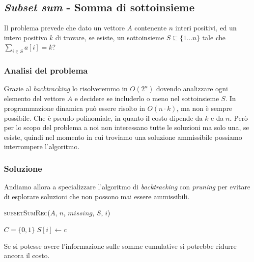     \subsection{\textit{Subset sum} - Somma di sottoinsieme}
        Il problema prevede che dato un vettore $A$ contenente $n$ interi positivi, ed un intero positivo $k$ di trovare, se esiste, un sottoinsieme $S\subseteq \{1\dots n\}$ tale che $\sum_{i\in S}a[i]=k$?
        \subsubsection{Analisi del problema}
            Grazie al \textit{backtracking} lo risolveremmo in $O(2^n)$ dovendo analizzare ogni elemento del vettore $A$ e decidere se includerlo o meno nel sottoinsieme $S$.\newline
            In programmazione dinamica può essere risolto in $O(n\cdot k)$, ma non è sempre possibile. Che è pseudo-polinomiale, in quanto il costo dipende da $k$ e da $n$.\newline
            Però per lo scopo del problema a noi non interessano tutte le soluzioni ma solo una, se esiste, quindi nel momento in cui troviamo una soluzione ammissibile possiamo interrompere l'algoritmo.
        \subsubsection{Soluzione}
            Andiamo allora a specializzare l'algoritmo di \textit{backtracking} con \textit{pruning} per evitare di esplorare soluzioni che non possono mai essere ammissibili. 
            \begin{algorithm}[H]
                \caption{\Bool \textsc{subsetSumRec}(\Int[] $A$, \Int $n$, \Int $missing$, \Int[] $S$, \Int $i$)}
                \begin{algorithmic}
                     
                        \State {}
                        \State \Return \True
                     
                        \State \Return \False
                    \Else {}
                        \State \Set $C = \{ 0,1\}$
                            \State $S[i] \gets c$ 
                                \State \Return \True
                            \EndIf
                        \EndFor
                        \State \Return \False
                    \EndIf
                \end{algorithmic}
            \end{algorithm}
            Se si potesse avere l'informazione sulle somme cumulative si potrebbe ridurre ancora il costo.
    